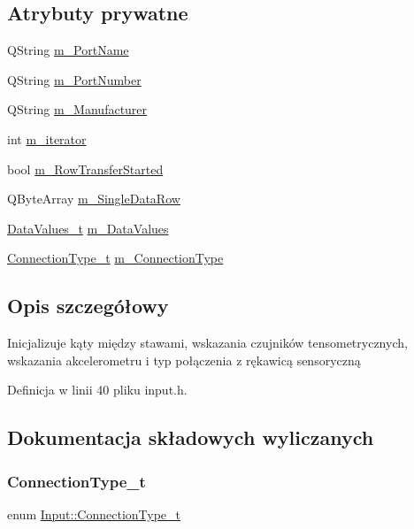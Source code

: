 \subsection*{Atrybuty prywatne}
\begin{DoxyCompactItemize}
\item 
Q\+String \hyperlink{class_input_a24dc520caff7c7c0d195acfa47342e28}{m\+\_\+\+Port\+Name}
\item 
Q\+String \hyperlink{class_input_a2d51aa2c3b8e7341eb5723421574472b}{m\+\_\+\+Port\+Number}
\item 
Q\+String \hyperlink{class_input_a8cdd2c6b1ed685b395a333ecd90441df}{m\+\_\+\+Manufacturer}
\item 
int \hyperlink{class_input_aa11e501a6d4eb1a595430b5c77e71d1c}{m\+\_\+iterator}
\item 
bool \hyperlink{class_input_ad80b752afa4bb13b0b042cecb36563ea}{m\+\_\+\+Row\+Transfer\+Started}
\item 
Q\+Byte\+Array \hyperlink{class_input_a50f1308ea6cf70d790cef25d0ac3004f}{m\+\_\+\+Single\+Data\+Row}
\item 
\hyperlink{struct_input_1_1_data_values__t}{Data\+Values\+\_\+t} \hyperlink{class_input_a8b404eeed83bc5943f5f5a71a111926a}{m\+\_\+\+Data\+Values}
\item 
\hyperlink{class_input_a3be20be9b454515798ecd3370f4e36fd}{Connection\+Type\+\_\+t} \hyperlink{class_input_aeccfe44263c5985405f94c5feb0ed0aa}{m\+\_\+\+Connection\+Type}
\end{DoxyCompactItemize}


\subsection{Opis szczegółowy}
Inicjalizuje kąty między stawami, wskazania czujników tensometrycznych, wskazania akcelerometru i typ połączenia z rękawicą sensoryczną 

Definicja w linii 40 pliku input.\+h.



\subsection{Dokumentacja składowych wyliczanych}
\mbox{\label{class_input_a3be20be9b454515798ecd3370f4e36fd}} 
\subsubsection{\texorpdfstring{Connection\+Type\+\_\+t}{ConnectionType\_t}}
{\footnotesize\ttfamily enum \hyperlink{class_input_a3be20be9b454515798ecd3370f4e36fd}{Input\+::\+Connection\+Type\+\_\+t}}


